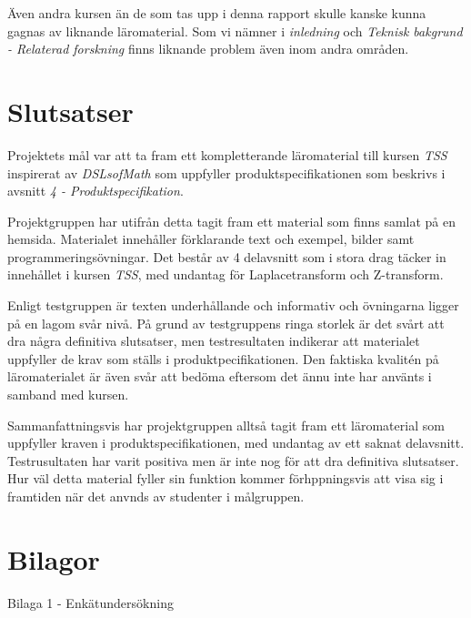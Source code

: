 \documentclass[]{article}
\begin{document}
Även andra kursen än de som tas upp i denna rapport skulle kanske
kunna gagnas av liknande läromaterial. Som vi nämner i
\textit{inledning} och \textit{Teknisk bakgrund - Relaterad forskning}
finns liknande problem även inom andra områden.


\section{Slutsatser}

Projektets mål var att ta fram ett kompletterande läromaterial till
kursen \textit{TSS} inspirerat av \textit{DSLsofMath} som uppfyller
produktspecifikationen som beskrivs i avsnitt \textit{4 - Produktspecifikation}.

Projektgruppen har utifrån detta tagit fram ett material som finns
samlat på en hemsida. Materialet innehåller förklarande text och exempel, bilder
samt programmeringsövningar. Det består av 4 delavsnitt
som i stora drag täcker  in innehållet i kursen \textit{TSS}, med
undantag för Laplacetransform och Z-transform.

Enligt testgruppen är texten underhållande och informativ och
 övningarna ligger på en lagom svår nivå. På grund av testgruppens
ringa storlek är det svårt att dra några definitiva slutsatser,
men testresultaten indikerar att materialet uppfyller de krav
som ställs i produktpecifikationen. Den faktiska kvalitén på
 läromaterialet är även svår att bedöma eftersom det
ännu inte har använts i samband med kursen.

Sammanfattningsvis har projektgruppen alltså tagit
fram ett läromaterial som uppfyller kraven i produktspecifikationen,
med undantag av ett saknat delavsnitt. Testrusultaten har varit
positiva men är inte nog för att dra definitiva slutsatser. Hur väl detta
material fyller sin funktion kommer förhppningsvis att
visa sig i framtiden när det anvnds av studenter i målgruppen.

\newpage





\newpage

\section{Bilagor}
Bilaga 1 - Enkätundersökning
\end{document}
